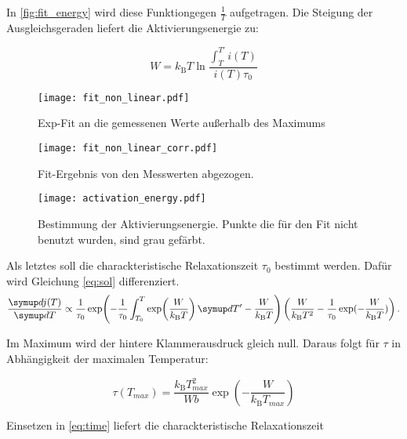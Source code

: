 In \autoref{fig:fit_energy} wird diese Funktiongegen $\frac{1}{T}$ aufgetragen. Die Steigung der Ausgleichsgeraden liefert die Aktivierungsenergie zu:
\begin{equation}
  
\end{equation}

\begin{equation}
  W = k_\mathrm{B} T \ln \frac{\int_T^{T'} i(T)}{ i(T) \tau_0}
  \label{eq:final}
\end{equation}

\begin{figure}
  \centering
  \texttt{[image: fit\_non\_linear.pdf]}
  \caption{Exp-Fit an die gemessenen Werte außerhalb des Maximums}
  \label{fig:fit_non_linear}
\end{figure}

\begin{figure}
  \centering
  \texttt{[image: fit\_non\_linear\_corr.pdf]}
  \caption{Fit-Ergebnis von den Messwerten abgezogen.}
  \label{fig:fit_non_linear_corr}
\end{figure}


\begin{figure}
  \centering
  \texttt{[image: activation\_energy.pdf]}
  \caption{Bestimmung der Aktivierungsenergie. Punkte die für den Fit nicht benutzt wurden, sind grau gefärbt.}
  \label{fig:fit_energy}
\end{figure}


Als letztes soll die charackteristische Relaxationszeit $\tau_0$ bestimmt werden. Dafür wird Gleichung \eqref{eq:sol} differenziert.
\begin{equation}
  \label{eq:crazy}
  \dd{j(T)}{T} \propto
    \frac{1}{\tau_0}
    \exp\!\left(
      -\frac{1}{\tau_0} \int_{T_0}^{T} \exp\! \left( \frac{W}{k_\mathrm{B} T} \right)  \dif{T'} - \frac{W}{k_\mathrm{B} T}
    \right) \left( \frac{W}{k_\mathrm{B} T^2} -   \frac{1}{\tau_0}\exp(-\frac{W}{k_\mathrm{B} T}) \right).
\end{equation}

Im Maximum wird der hintere Klammerausdruck gleich null. Daraus folgt für $\tau$ in Abhängigkeit der maximalen Temperatur:

\begin{equation}
  \label{eq:tau}
  \tau(T_{max}) = \frac{k_\mathrm{B} T_{max}^2}{W b} \exp\left(-\frac{W}{k_\mathrm{B} T_{max}} \right)
\end{equation}

Einsetzen in \eqref{eq:time} liefert die  charackteristische Relaxationszeit
\begin{equation}
  
\end{equation}
